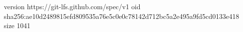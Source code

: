 version https://git-lfs.github.com/spec/v1
oid sha256:ae10d2489815efd809535a76e5c0e0c78142d712bc5a2e495a9fd5cd0133e418
size 1041

